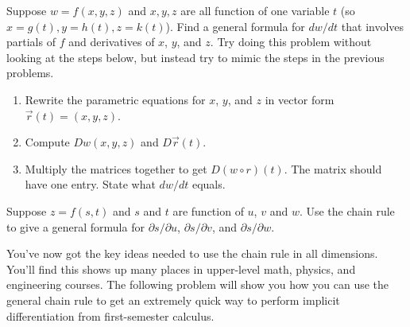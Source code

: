 \begin{problem}%
 Suppose $w=f(x,y,z)$ and $x,y,z$ are all function of one variable $t$ (so $x=g(t), y=h(t), z=k(t)$).  
 Find a general formula for $dw/dt$ that involves partials of $f$ and derivatives of $x$, $y$, and $z$. Try doing this problem without looking at the steps below, but instead try to mimic the steps in the previous problems.
\begin{enumerate}
 \item Rewrite the parametric equations for $x$, $y$, and $z$ in vector form $\vec r(t) = (x,y,z)$.
 \item Compute $Dw(x,y,z)$ and $D\vec r(t)$. 
 \item Multiply the matrices together to get $D(w\circ r)(t)$.  The matrix should have one entry. State what $dw/dt$ equals.
\end{enumerate}
\end{problem}


\begin{problem}%
 Suppose $z=f(s,t)$ and $s$ and $t$ are function of $u$, $v$ and $w$.  Use the chain rule to give a general formula for $\partial s/\partial u$, $\partial s/\partial v$, and $\partial s/\partial w$. 
\end{problem}

You've now got the key ideas needed to use the chain rule in all dimensions. You'll find this shows up many places in upper-level math, physics, and engineering courses. The following problem will show you how you can use the general chain rule to get an extremely quick way to perform implicit differentiation from first-semester calculus.

